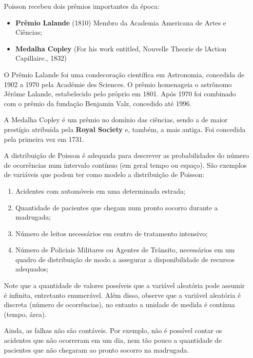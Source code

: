 Poisson recebeu dois prêmios importantes da época:

\begin{itemize}
    \item \textbf{Prêmio Lalande} (1810) Membro da Academia Americana de Artes e Ciências;
    \item \textbf{Medalha Copley} (For his work entitled, Nouvelle Theorie de lAction Capillaire., 1832)
\end{itemize}

O Prêmio Lalande foi uma condecoração científica em Astronomia, concedida de 1902 a 1970 pela Académie des Sciences. O prêmio homenageia o astrônomo Jérôme Lalande, estabelecido pelo próprio em 1801. Após 1970 foi combinado com o prêmio da fundação Benjamin Valz, concedido até 1996.\vskip0.3cm


A Medalha Copley é um prêmio no domínio das ciências, sendo
a de maior prestígio atribuída pela \textbf{Royal Society} e, também, a mais antiga. Foi concedida pela primeira vez em 1731.\vskip0.3cm


  
\inic A distribuição de Poisson é adequada para descrever as probabilidades do número de ocorrências num intervalo contínuo (em geral tempo ou espaço). São exemplos de variáveis que podem ter como modelo a distribuição de Poisson:

\begin{enumerate}
    \item Acidentes com automóveis em uma determinada estrada;
    \item Quantidade de pacientes que chegam num pronto socorro durante a madrugada;
    \item  Número de leitos necessários em centro de tratamento intensivo;
    \item  Número de Policiais Militares ou Agentes de Trânsito, necessários em um quadro de distribuição de modo a assegurar a disponibilidade de recursos adequados;
\end{enumerate}


\newpage 
\inic Note que a quantidade de valores possíveis que a variável aleatória pode assumir é infinita, entretanto enumerável. Além disso, observe que a variável aleatória é discreta (número de ocorrências), no entanto a unidade de medida é contínua (tempo, área).\vskip0.3cm

Ainda, as falhas não são contáveis. Por exemplo, não é possível contar os acidentes que não ocorreram em um dia, nem tão pouco a quantidade de pacientes que não chegaram ao pronto socorro na madrugada.
 
